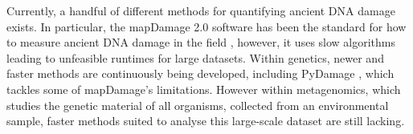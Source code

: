 Currently, a handful of different methods for quantifying ancient DNA damage exists. In particular, the mapDamage 2.0 software has been the standard for how to measure ancient DNA damage in the field \autocite{jonssonMapDamage2FastApproximate2013}, however, it uses slow algorithms leading to unfeasible runtimes for large datasets.
Within genetics, newer and faster methods are continuously being developed, including PyDamage \autocite{borryPyDamageAutomatedAncient2021}, which tackles some of mapDamage's limitations. However within metagenomics, which studies the genetic material of all organisms, collected from an environmental sample, faster methods suited to analyse this large-scale dataset are still lacking.

